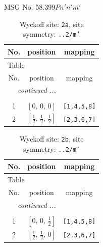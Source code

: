 \documentclass[fleqn,8pt]{jsarticle}
\begin{document}
\setcounter{MaxMatrixCols}{32}

\renewcommand{\tablename}{Table~}
\renewcommand{\figurename}{Figure~}
\begin{center}
\LARGE
MSG No. 58.399\quad$Pn'n'm'$
\end{center}
\renewcommand{\arraystretch}{1.2}
\begin{longtable}{ccc}
\caption{Wyckoff site: {\tt 2a}, site symmetry: {\tt ..2/m'}}
 \\
 \hline \hline
No. & position & mapping \\ \hline \endfirsthead

\multicolumn{2}{l}{\tablename\ \thetable{}} \\
 \hline \hline
No. & position & mapping \\ \hline \endhead

 \hline \hline
\multicolumn{2}{r}{\footnotesize\it continued ...} \\ \endfoot

 \hline \hline
\multicolumn{2}{r}{} \\ \endlastfoot

1 & $\left[ 0,\, 0,\, 0 \right]$ & {\tt [1,4,5,8]} \\ \hline
2 & $\left[ \frac{1}{2},\, \frac{1}{2},\, \frac{1}{2} \right]$ & {\tt [2,3,6,7]} \\
\end{longtable}
\renewcommand{\arraystretch}{1.2}
\begin{longtable}{ccc}
\caption{Wyckoff site: {\tt 2b}, site symmetry: {\tt ..2/m'}}
 \\
 \hline \hline
No. & position & mapping \\ \hline \endfirsthead

\multicolumn{2}{l}{\tablename\ \thetable{}} \\
 \hline \hline
No. & position & mapping \\ \hline \endhead

 \hline \hline
\multicolumn{2}{r}{\footnotesize\it continued ...} \\ \endfoot

 \hline \hline
\multicolumn{2}{r}{} \\ \endlastfoot

1 & $\left[ 0,\, 0,\, \frac{1}{2} \right]$ & {\tt [1,4,5,8]} \\ \hline
2 & $\left[ \frac{1}{2},\, \frac{1}{2},\, 0 \right]$ & {\tt [2,3,6,7]} \\
\end{longtable}
\end{document}
